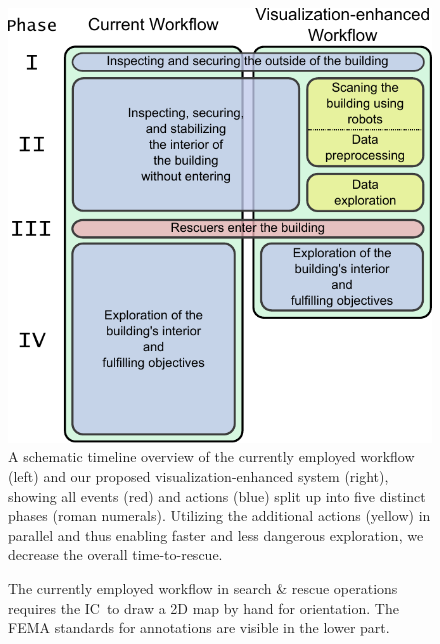 \documentclass[conference,10pt,letter]{IEEEtran}
\def\IC{IC}
\begin{document}
\begin{figure}
	\centering
	\includegraphics[width=0.9\columnwidth]{figures/workflow.pdf}
	\caption{A schematic timeline overview of the currently employed workflow (left) and our proposed visualization-enhanced system (right), showing all events (red) and actions (blue) split up into five distinct phases (roman numerals). Utilizing the additional actions (yellow) in parallel and thus enabling faster and less dangerous exploration, we decrease the overall time-to-rescue.}
	\label{fig:workflow:workflow}
\end{figure}

\begin{figure}[b]
    \vspace{-0.2cm}
	\centering
	\caption{The currently employed workflow in search \& rescue operations requires the \IC\ to draw a 2D map by hand for orientation. The FEMA standards for annotations are visible in the lower part.}
	\label{fig:workflow:sota}
\end{figure}
\end{document}

